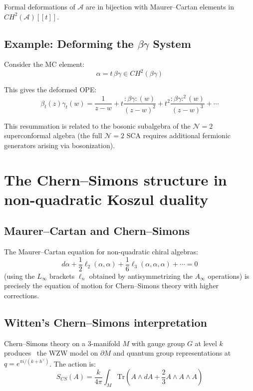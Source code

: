 \begin{theorem}
\label{thm:deformations-maurer-cartan}
Formal deformations of $\mathcal{A}$ are in bijection with Maurer--Cartan elements in $CH^2(\mathcal{A})[[t]]$.
\end{theorem}

\subsection{\texorpdfstring{Example: Deforming the $\beta\gamma$ System}{Example: Deforming the System}}

Consider the MC element:
\[
\alpha = t \, \beta \gamma \in CH^2(\beta\gamma)
\]

This gives the deformed OPE:
\[
\beta_t(z)\gamma_t(w) = \frac{1}{z-w} + t \frac{:\beta\gamma:(w)}{(z-w)^2} + t^2 \frac{:\beta\gamma:^2(w)}{(z-w)^3} + \cdots
\]

This resummation is related to the bosonic subalgebra of the $\mathcal{N}=2$ superconformal algebra (the full $\mathcal{N}=2$ SCA requires additional fermionic generators arising via bosonization).


\section{The Chern--Simons structure in non-quadratic Koszul duality}

\subsection{Maurer--Cartan and Chern--Simons}

The Maurer--Cartan equation for non-quadratic chiral algebras:
\[
d\alpha + \frac{1}{2}\ell_2(\alpha, \alpha) + \frac{1}{6}\ell_3(\alpha, \alpha, \alpha) + \cdots = 0
\]
(using the $L_\infty$ brackets $\ell_n$ obtained by antisymmetrizing the $A_\infty$ operations)
is precisely the equation of motion for Chern--Simons theory with higher corrections.

\subsection{Witten's Chern--Simons interpretation}

Chern--Simons theory on a 3-manifold $M$ with gauge group $G$ at level $k$ produces~\cite{Wit89} the WZW model on $\partial M$ and quantum group representations at $q = e^{\pi i/(k+h^\vee)}$.  The action is:
\[
S_{CS}(A) = \frac{k}{4\pi} \int_M \text{Tr}\left(A \wedge dA + \frac{2}{3}A \wedge A \wedge A\right)
\]

